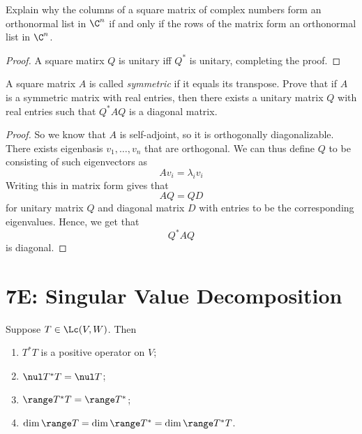 \documentclass{extarticle}
\begin{document}
\begin{problem}{13}
    Explain why the columns of a square matrix of complex numbers form an orthonormal list in \(\C^n\)
    if and only if the rows of the matrix form an orthonormal list in \(\C^n\).
\end{problem}

\begin{proof}
A square matirx \(Q\) is unitary iff \(Q^*\) is unitary, completing the proof.
\end{proof}

\begin{problem}{18}
    A square matrix \(A\) is called \emph{symmetric} if it equals its transpose. Prove that if
    \(A\) is a symmetric matrix with real entries, then there exists a unitary matrix \(Q\) with
    real entries such that \(Q^* A Q\) is a diagonal matrix.
\end{problem}

\begin{proof}
So we know that \(A\) is self-adjoint, so it is orthogonally diagonalizable. There exists eigenbasis
\(v_1, \ldots, v_n\) that are orthogonal. We can thus define \(Q\) to be consisting of such eigenvectors
as
\[Av_i = \lambda_i v_i\]
Writing this in matrix form gives that
\[AQ = QD\]
for unitary matrix \(Q\) and diagonal matrix \(D\) with entries to be the corresponding eigenvalues.
Hence, we get that
\[Q^*AQ\]
is diagonal.
\end{proof}


\newpage
\section*{7E: Singular Value Decomposition}

\begin{lemma}[properties of \(T^* T\)]
    Suppose \(T \in \Lc(V, W)\). Then
    \begin{enumerate}[label=(\alph*)]
        \item \(T^* T \) is a positive operator on \(V\);
        \item \(\nul T^* T = \nul T\);
        \item \(\range T^* T = \range T^*\);
        \item \(\dim \range T = \dim \range T^* = \dim \range T^* T\).
    \end{enumerate}
\end{lemma}
\end{document}
